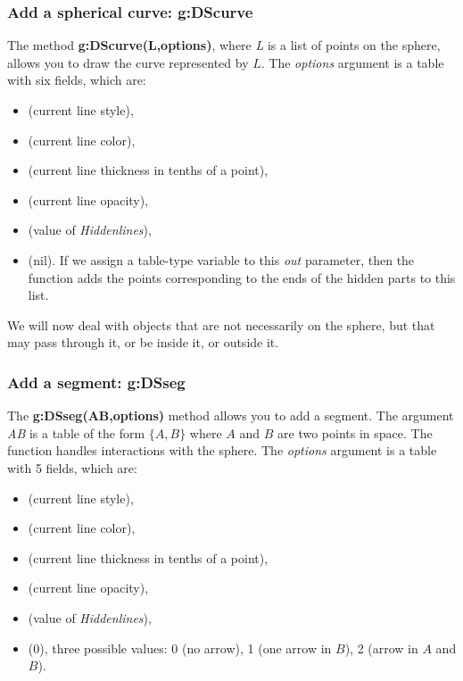 \subsubsection{Add a spherical curve: g:DScurve}

The method \textbf{g:DScurve(L,options)}, where \emph{L} is a list of points on the sphere, allows you to draw the curve represented by $L$. The \emph{options} argument is a table with six fields, which are:
\begin{itemize}
    \item {} (current line style),
    \item {} (current line color),
    \item {} (current line thickness in tenths of a point),
    \item {} (current line opacity),
    \item {} (value of \emph{Hiddenlines}),
    \item {} (nil). If we assign a table-type variable to this \emph{out} parameter, then the function adds the points corresponding to the ends of the hidden parts to this list.
\end{itemize}

We will now deal with objects that are not necessarily on the sphere, but that may pass through it, or be inside it, or outside it.

\subsubsection{ Add a segment: g:DSseg}

The \textbf{g:DSseg(AB,options)} method allows you to add a segment. The argument \emph{AB} is a table of the form $\{A,B\}$ where $A$ and $B$ are two points in space. The function handles interactions with the sphere. The \emph{options} argument is a table with 5 fields, which are:
\begin{itemize}
    \item {} (current line style),
    \item {} (current line color),
    \item {} (current line thickness in tenths of a point),
    \item {} (current line opacity),
    \item {} (value of \emph{Hiddenlines}),
    \item {} (0), three possible values: 0 (no arrow), 1 (one arrow in $B$), 2 (arrow in $A$ and $B$).
\end{itemize}

